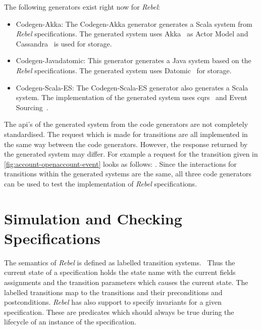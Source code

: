 The following generators exist right now for \textit{Rebel}:
\begin{itemize}

\item Codegen-Akka: The Codegen-Akka generator generates a Scala system from
\textit{Rebel} specifications. The generated system uses
Akka~\cite[p.~4]{roestenburg2016akka} as Actor Model and
Cassandra~\cite{lakshman2010cassandra} is used for storage.

\item Codegen-Javadatomic: This generator generates a Java system based on the
\textit{Rebel} specifications. The generated system uses
Datomic~\cite[p.~170-172]{anderson2016professional} for storage.

\item Codegen-Scala-ES: The Codegen-Scala-ES generator also generates a Scala
system. The implementation of the generated system uses
\gls{cqrs}~\cite{fowler2011cqrs} and Event Sourcing~\cite{fowler2005event}.

\end{itemize}

The \gls{api}'s of the generated system from the code generators are not completely
standardised. The request which is made for transitions are all implemented in
the same way between the code generators. However, the response returned by the
generated system may differ. For example a request for the transition given in
\autoref{fig:account-openaccount-event} looks as follows:
. Since the
interactions for transitions within the generated systems are the same, all
three code generators can be used to test the implementation of \textit{Rebel}
specifications.

\section{Simulation and Checking Specifications}


The semantics of \textit{Rebel} is defined as labelled transition
systems.~\cite[p.~5]{stoel_storm_vinju_bosman_2016} Thus the current state of a
specification holds the state name with the current fields assignments and the
transition parameters which causes the current state. The labelled transitions map
to the transitions and their preconditions and postconditions. \textit{Rebel} has
also support to specify invariants for a given specification. These are
predicates which should always be true during the lifecycle of an instance of
the specification.

